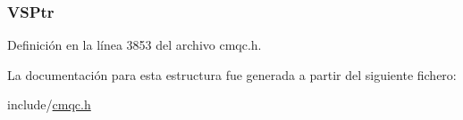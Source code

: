 \hypertarget{structtag_m_q_c_h_a_r_v_ae4adca62d509c0906d711f7c34e2b2f9}{}
\subsubsection[{V\+S\+Ptr}]{ V\+S\+Ptr}\label{structtag_m_q_c_h_a_r_v_ae4adca62d509c0906d711f7c34e2b2f9}


Definición en la línea 3853 del archivo cmqc.\+h.



La documentación para esta estructura fue generada a partir del siguiente fichero\+:\begin{DoxyCompactItemize}
\item 
include/\hyperlink{cmqc_8h}{cmqc.\+h}\end{DoxyCompactItemize}
